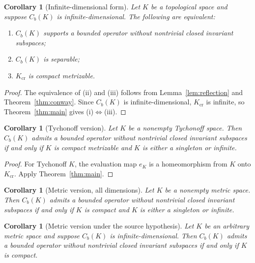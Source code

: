 \documentclass[11pt]{article}
\newtheorem{corollary}[theorem]{Corollary}
\theoremstyle{remark}
\newcommand{\Cb}{C_b}
\begin{document}
\begin{corollary}[Infinite-dimensional form]\label{cor:infinite}
Let $K$ be a topological space and suppose $\Cb(K)$ is infinite-dimensional.
The following are equivalent:
\begin{enumerate}[label=\textup{(\roman*)},leftmargin=2.2em]
  \item $\Cb(K)$ supports a bounded operator without nontrivial closed
        invariant subspaces;
  \item $\Cb(K)$ is separable;
  \item $K_{\mathrm{cr}}$ is compact metrizable.
\end{enumerate}
\end{corollary}

\begin{proof}
The equivalence of \textup{(ii)} and \textup{(iii)} follows from
Lemma~\ref{lem:reflection} and Theorem~\ref{thm:conway}.  Since
$\Cb(K)$ is infinite-dimensional, $K_{\mathrm{cr}}$ is infinite, so
Theorem~\ref{thm:main} gives \textup{(i)$\Leftrightarrow$(iii)}.
\end{proof}

\begin{corollary}[Tychonoff version]\label{cor:tych}
Let $K$ be a nonempty Tychonoff space.  Then $\Cb(K)$ admits a bounded
operator without nontrivial closed invariant subspaces if and only if $K$ is
compact metrizable and $K$ is either a singleton or infinite.
\end{corollary}

\begin{proof}
For Tychonoff $K$, the evaluation map $e_K$ is a homeomorphism from $K$ onto
$K_{\mathrm{cr}}$.  Apply Theorem~\ref{thm:main}.
\end{proof}

\begin{corollary}[Metric version, all dimensions]\label{cor:metric-all}
Let $K$ be a nonempty metric space.  Then $\Cb(K)$ admits a bounded operator
without nontrivial closed invariant subspaces if and only if $K$ is compact
and $K$ is either a singleton or infinite.
\end{corollary}

\begin{corollary}[Metric version under the source hypothesis]\label{cor:metric}
Let $K$ be an arbitrary metric space and suppose $\Cb(K)$ is
infinite-dimensional.  Then $\Cb(K)$ admits a bounded operator without
nontrivial closed invariant subspaces if and only if $K$ is compact.
\end{corollary}
\end{document}
